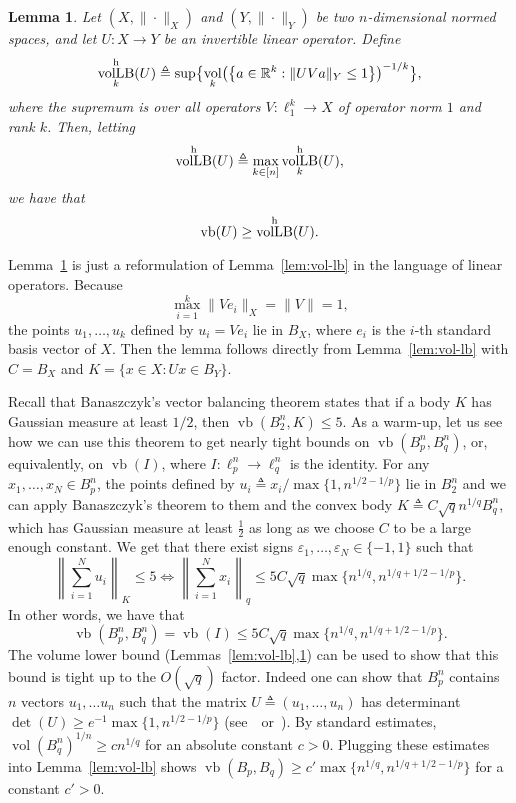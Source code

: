 \documentclass[11pt]{article}
\newtheorem{lemma}[theorem]{Lemma}
\newcommand{\R}{{\mathbb{R}}}
\newcommand\eps{\varepsilon}
\newcommand{\eqdef}{\triangleq}
\newcommand{\set}[1]{\left\{ #1 \right\}}
\DeclareMathOperator{\vollb}{volLB}
\DeclareMathOperator{\vb}{vb}
\DeclareMathOperator{\vol}{vol}
\begin{document}
\begin{lemma}
\label{lem:vol-lb-oper}
Let $(X, \|\cdot\|_X)$ and $(Y, \|\cdot\|_Y)$ be two $n$-dimensional
normed spaces, and let $U:X \to Y$ be an invertible linear
operator. Define
\[
\vollb_k^{\rm h}(U) \eqdef
\sup\bigl\{\vol_k\bigl(\set{a \in \R^k: \|UV a\|_Y \le 1}\bigr)^{-1/k}\bigr\},
\]
where the supremum is over all operators $V:\ell_1^k \to X$ of
operator norm $1$ and rank $k$. Then, letting
\[
\vollb^{\rm h}(U) \eqdef \max_{k \in [n]} \vollb_k^{\rm h}(U),
\]
we have that
\[
\vb(U) \geq \vollb^{\rm h}(U).
\]
\end{lemma}

Lemma~\ref{lem:vol-lb-oper} is just a reformulation of
Lemma~\ref{lem:vol-lb} in the language of linear operators. Because
\[
\max_{i = 1}^k{\|Ve_i\|_X} = \|V\| = 1,
\]
the points $u_1, \ldots, u_k$ defined by $u_i = V e_i$ lie in $B_X$,
where $e_i$ is the $i$-th standard basis vector of $X$. Then the
lemma follows directly from Lemma~\ref{lem:vol-lb} with $C = B_X$
and $K = \{x \in X: Ux \in B_Y\}$. 

Recall that Banaszczyk's vector balancing theorem states that if a
body $K$ has Gaussian measure at least $1/2$, then $\vb(B_2^n, K) \le
5$. As a warm-up, let us see how we can use this theorem to get
nearly tight bounds on $\vb(B^n_p, B^n_q)$, or, equivalently, on
$\vb(I)$, where $I:\ell_p^n \to \ell_q^n$ is the identity. For any
$x_1, \ldots, x_N \in B_p^n$, the points defined by $u_i \eqdef
{x_i}/{\max\{1, n^{1/2 -1/p}\}}$ lie in $B_2^n$ and we can apply
Banaszczyk's theorem to them and the convex body $K \eqdef C \sqrt{q}
n^{1/q} B_q^n$, which has Gaussian
measure at least $\frac12$ as long as we choose $C$ to be a large
enough constant. We get that there exist signs $\eps_1, \ldots, \eps_N
\in \{-1, 1\}$ such that 
\[
\left\|\sum_{i = 1}^N{u_i}\right\|_K \le 5
\iff
\left\|\sum_{i = 1}^N{x_i}\right\|_q \le
 5C\sqrt{q}\max\{n^{1/q}, n^{1/q + 1/2 -1/p}\}. 
\]
In other words, we have that 
\[
\vb(B_p^n, B_q^n) = \vb(I) \le
5C\sqrt{q}\max\{n^{1/q}, n^{1/q + 1/2 -1/p}\}.
\]
The volume lower bound (Lemmas~\ref{lem:vol-lb},\ref{lem:vol-lb-oper})
can be used to show that this bound is tight up to the $O(\sqrt{q})$
factor. Indeed one can show that $B_p^n$ contains $n$ vectors $u_1,
\ldots u_n$ such that the matrix $U \eqdef  (u_1, \ldots, u_n)$ has
determinant $\det(U) \ge e^{-1}  \max\{1, n^{1/2 -1/p}\}$
(see~\cite{Ball89}~or~\cite{N15}). By standard estimates,
$\vol(B_q^n)^{1/n} \ge c n^{1/q}$ for an absolute constant
$c >0$. Plugging these estimates into Lemma~\ref{lem:vol-lb} shows
$\vb(B_p, B_q) \ge c' \max\{n^{1/q}, n^{1/q + 1/2 -1/p}\}$ for a
constant $c' > 0$. 
\end{document}
